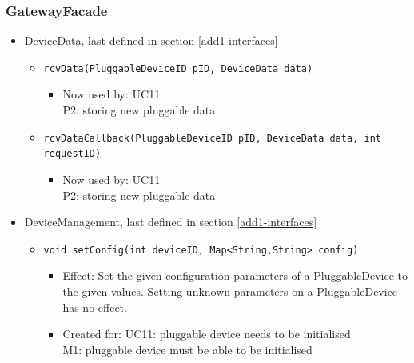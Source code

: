     \subsubsection{GatewayFacade}
        \begin{itemize}
            \item DeviceData, last defined in section \ref{add1-interfaces}
            \begin{itemize}
                \item \texttt{rcvData(PluggableDeviceID pID, DeviceData data)}
                    \begin{itemize}
                        \item Now used by: UC11 \\
                              P2: storing new pluggable data
                    \end{itemize}
                \item \texttt{rcvDataCallback(PluggableDeviceID pID, DeviceData data, int requestID)}
                    \begin{itemize}
                        \item Now used by: UC11 \\
                              P2: storing new pluggable data
                    \end{itemize}
            \end{itemize}

            \item DeviceManagement, last defined in section \ref{add1-interfaces}
            \begin{itemize}
                \item \texttt{void setConfig(int deviceID, Map<String,String> config)}
                \begin{itemize}
                    \item Effect: Set the given configuration parameters of a
                          PluggableDevice to the given values. Setting unknown parameters
                          on a PluggableDevice has no effect.
                    \item Created for: UC11: pluggable device needs to be initialised \\
                          M1: pluggable device must be able to be initialised
                \end{itemize}
            \end{itemize}
        \end{itemize}

